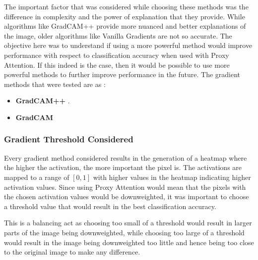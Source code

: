 The important factor that was considered while choosing these methods was the difference in complexity and the power of explanation that they provide. While algorithms like GradCAM++ \cite{chattopadhayGradCAMGeneralizedGradientBased2018} provide more nuanced and better explanations of the image, older algorithms like Vanilla Gradients \cite{zeilerVisualizingUnderstandingConvolutional2013} are not so accurate. The objective here was to understand if using a more powerful method would improve performance with respect to classification accuracy when used with Proxy Attention. If this indeed is the case, then it would be possible to use more powerful methods to further improve performance in the future.
The gradient methods that were tested are as :
\begin{itemize}
    \item \textbf{GradCAM++} \cite{chattopadhayGradCAMGeneralizedGradientBased2018}.
    \item \textbf{GradCAM} \cite{selvarajuGradCAMVisualExplanations}
\end{itemize}

\subsubsection{Gradient Threshold Considered}
Every gradient method considered results in the generation of a heatmap where the higher the activation, the more important the pixel is. The activations are mapped to a range of $[0,1]$ with higher values in the heatmap indicating higher activation values. Since using Proxy Attention would mean that the pixels with the chosen activation values would be downweighted, it was important to choose a threshold value that would result in the best classification accuracy.

This is a balancing act as choosing too small of a threshold would result in larger parts of the image being downweighted, while choosing too large of a threshold would result in the image being downweighted too little and hence being too close to the original image to make any difference.

